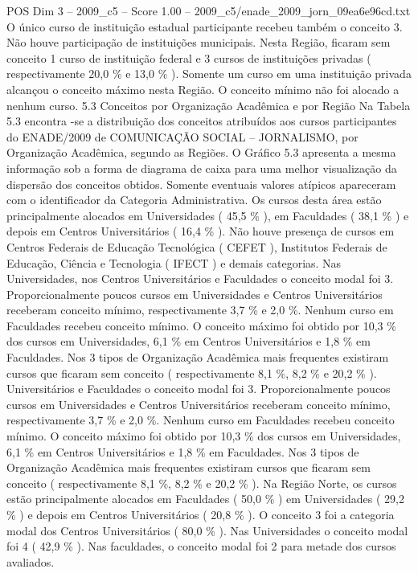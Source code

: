 \begin{textsample}{POS Dim 3 – 2009\_c5 – Score 1.00 – 2009\_c5/enade\_2009\_jorn\_09ea6e96cd.txt}
O único curso de instituição estadual participante recebeu também o conceito 3.
Não houve participação de instituições municipais.
Nesta Região, ficaram sem conceito 1 curso de instituição federal e 3 cursos de instituições privadas ( respectivamente 20,0 \% e 13,0 \% ).
Somente um curso em uma instituição privada alcançou o conceito máximo nesta Região.
O conceito mínimo não foi alocado a nenhum curso. 5.3 Conceitos por Organização Acadêmica e por Região Na Tabela 5.3 encontra -se a distribuição dos conceitos atribuídos aos cursos participantes do ENADE/2009 de COMUNICAÇÃO SOCIAL – JORNALISMO, por Organização Acadêmica, segundo as Regiões.
O Gráfico 5.3 apresenta a mesma informação sob a forma de diagrama de caixa para uma melhor visualização da dispersão dos conceitos obtidos.
Somente eventuais valores atípicos apareceram com o identificador da Categoria Administrativa.
Os cursos desta área estão principalmente alocados em Universidades ( 45,5 \% ), em Faculdades ( 38,1 \% ) e depois em Centros Universitários ( 16,4 \% ).
Não houve presença de cursos em Centros Federais de Educação Tecnológica ( CEFET ), Institutos Federais de Educação, Ciência e Tecnologia ( IFECT ) e demais categorias.
Nas Universidades, nos Centros Universitários e Faculdades o conceito modal foi 3.
Proporcionalmente poucos cursos em Universidades e Centros Universitários receberam conceito mínimo, respectivamente 3,7 \% e 2,0 \%.
Nenhum curso em Faculdades recebeu conceito mínimo.
O conceito máximo foi obtido por 10,3 \% dos cursos em Universidades, 6,1 \% em Centros Universitários e 1,8 \% em Faculdades.
Nos 3 tipos de Organização Acadêmica mais frequentes existiram cursos que ficaram sem conceito ( respectivamente 8,1 \%, 8,2 \% e 20,2 \% ).
Universitários e Faculdades o conceito modal foi 3.
Proporcionalmente poucos cursos em Universidades e Centros Universitários receberam conceito mínimo, respectivamente 3,7 \% e 2,0 \%.
Nenhum curso em Faculdades recebeu conceito mínimo.
O conceito máximo foi obtido por 10,3 \% dos cursos em Universidades, 6,1 \% em Centros Universitários e 1,8 \% em Faculdades.
Nos 3 tipos de Organização Acadêmica mais frequentes existiram cursos que ficaram sem conceito ( respectivamente 8,1 \%, 8,2 \% e 20,2 \% ).
Na Região Norte, os cursos estão principalmente alocados em Faculdades ( 50,0 \% ) em Universidades ( 29,2 \% ) e depois em Centros Universitários ( 20,8 \% ).
O conceito 3 foi a categoria modal dos Centros Universitários ( 80,0 \% ).
Nas Universidades o conceito modal foi 4 ( 42,9 \% ).
Nas faculdades, o conceito modal foi 2 para metade dos cursos avaliados.

\end{textsample}

